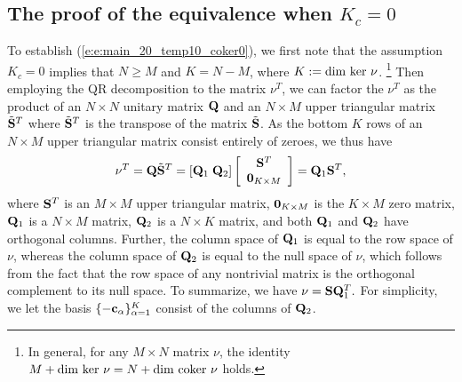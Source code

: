 \documentclass[ amsmath,amssymb,nofootinbib
]{revtex4-1}
\newcommand{\bQ}{{\bf Q}}
\newcommand{\bS}{{\bf S}}
\newcommand{\bc}{{\bf c}}
\begin{document}
\subsection{The proof of the equivalence when $K_c=0$}\label{sec:eq0}
To establish (\ref{e:e:main_20_temp10_coker0}),
we first note that the assumption $K_c =0$ implies that $N \ge M$ and $K=N-M$, where $K:= {\rm dim \ ker}\  \nu$. \footnote{In general, for any $M\times N$ matrix $\nu$, the identity $M+ {\rm dim \ ker} \ \nu = N + {\rm dim \ coker } \ \nu $ holds. }
Then employing the QR decomposition  to the matrix $\nu^T$,
we can factor the $\nu^T$
as the product of an $N \times N$ unitary matrix $\bQ$
and an $N \times M$ upper triangular matrix $\tilde{\bS}^T$
where $\tilde{\bS}^T$ is the transpose of the matrix $\tilde{\bS}$.
As the bottom $K$ rows of an $N \times M$ upper triangular matrix consist entirely of zeroes,
we thus have
\begin{align}  \label{e:nu_temp30}
   \nu^T  = \bQ \tilde{\bS}^T = [\bQ_1  \;  \bQ_2]
                  \left[\begin{array}{c}
                      \bS^T \\
                      {\bf 0}_{K \times M}\\
                    \end{array}\right]
                = \bQ_1  \bS^T,
\end{align}
where $\bS^T$ is an $M\times M$ upper triangular matrix, ${\bf 0}_{K \times M}$ is the $K \times M$ zero matrix,
$\bQ_1$ is a $N \times M$ matrix, $\bQ_2$ is a $N \times K$ matrix, and both $\bQ_1$ and $\bQ_2$ have orthogonal columns.
Further, the column space of $\bQ_1$ is equal to the row space of $\nu$,
whereas  the column space of $\bQ_2$ is equal to the null space of $\nu$,
which   follows from the fact
that the row space of any nontrivial matrix is the orthogonal complement to its null space.
To summarize, we have
$
   \nu =  \bS \bQ_1^T.
$
For simplicity, we let the basis $\{-\bc_\alpha\}_{\alpha=1}^K$ consist of the columns of $\bQ_2$.
\end{document}
